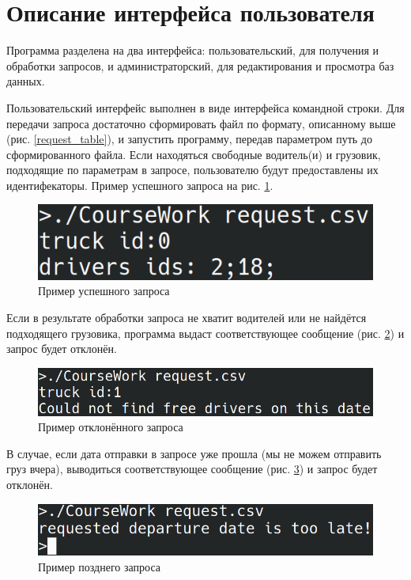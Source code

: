 \section{Описание интерфейса пользователя}
\setcounter{figure}{0}

Программа разделена на два интерфейса: 
пользовательский, для получения и обработки запросов, 
и администраторский, для редактирования и просмотра баз данных.

Пользовательский интерфейс выполнен в виде интерфейса командной строки. 
Для передачи запроса достаточно сформировать файл по формату, 
описанному выше 
(рис. \ref{request_table}), 
и запустить программу, 
передав параметром путь до сформированного файла. 
Если находяться свободные водитель(и) и грузовик,
подходящие по параметрам в запросе, пользователю будут предоставлены 
их идентифекаторы. Пример успешного запроса на рис. \ref{request_accepted}.

\begin{figure}[hpt!]
    \centering
    \includegraphics[width=0.7\linewidth]{photo/interface/request_accepted}
    \caption{Пример успешного запроса}
    \label{request_accepted}
\end{figure}

Если в результате обработки запроса не хватит водителей или
не найдётся подходящего грузовика, программа выдаст соответствующее 
сообщение (рис. \ref{request_denied}) и запрос будет отклонён.

\begin{figure}[hpt!]
    \centering
    \includegraphics[width=0.7\linewidth]{photo/interface/request_denied}
    \caption{Пример отклонённого запроса}
    \label{request_denied}
\end{figure}

В случае, если дата отправки в запросе уже прошла 
(мы не можем отправить груз вчера),
выводиться соответствующее 
сообщение (рис. \ref{request_late}) и запрос будет отклонён.

\begin{figure}[hpt!]
    \centering
    \includegraphics[width=0.7\linewidth]{photo/interface/request_late}
    \caption{Пример позднего запроса}
    \label{request_late}
\end{figure}

